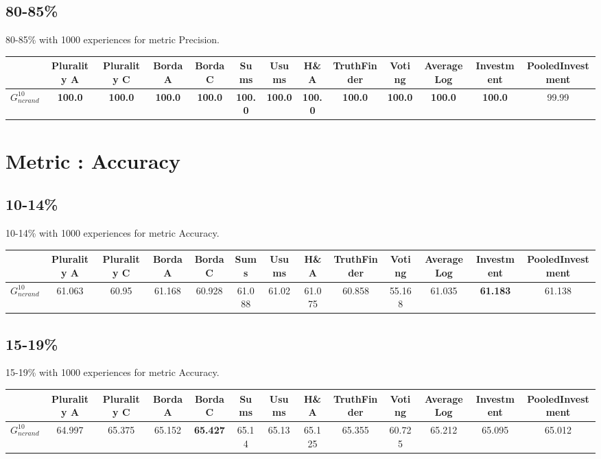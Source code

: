 \documentclass{article}
\newcommand{\graph}[2]{$G_{#1}^{#2}$}
\begin{document}
\subsection{80-85\%}

80-85\% with 1000 experiences for metric Precision.

\noindent\begin{tabular}{|l|c|c|c|c|c|c|c|c|c|c|c|c|}
\hline
& Plurality A& Plurality C& Borda A& Borda C& Sums& Usums& H\&A& TruthFinder& Voting& AverageLog& Investment& PooledInvestment\\
\hline
\graph{ncrand}{10} &\textbf{100.0}&\textbf{100.0}&\textbf{100.0}&\textbf{100.0}&\textbf{100.0}&\textbf{100.0}&\textbf{100.0}&\textbf{100.0}&\textbf{100.0}&\textbf{100.0}&\textbf{100.0}&99.99\\
\hline
\end{tabular}
\newpage
\newpage
\section{Metric : Accuracy}

\newpage

\subsection{10-14\%}

10-14\% with 1000 experiences for metric Accuracy.

\noindent\begin{tabular}{|l|c|c|c|c|c|c|c|c|c|c|c|c|}
\hline
& Plurality A& Plurality C& Borda A& Borda C& Sums& Usums& H\&A& TruthFinder& Voting& AverageLog& Investment& PooledInvestment\\
\hline
\graph{ncrand}{10} &61.063&60.95&61.168&60.928&61.088&61.02&61.075&60.858&55.168&61.035&\textbf{61.183}&61.138\\
\hline
\end{tabular}
\newpage

\subsection{15-19\%}

15-19\% with 1000 experiences for metric Accuracy.

\noindent\begin{tabular}{|l|c|c|c|c|c|c|c|c|c|c|c|c|}
\hline
& Plurality A& Plurality C& Borda A& Borda C& Sums& Usums& H\&A& TruthFinder& Voting& AverageLog& Investment& PooledInvestment\\
\hline
\graph{ncrand}{10} &64.997&65.375&65.152&\textbf{65.427}&65.14&65.13&65.125&65.355&60.725&65.212&65.095&65.012\\
\hline
\end{tabular}
\newpage
\end{document}
